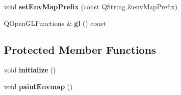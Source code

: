 \begin{DoxyCompactItemize}
\item 
\hypertarget{class_painter_afb568401ef2792e27e4f565bf35cb6bb}{}void {\bfseries set\+Env\+Map\+Prefix} (const Q\+String \&env\+Map\+Prefix)\label{class_painter_afb568401ef2792e27e4f565bf35cb6bb}

\item 
\hypertarget{class_painter_a0c2b82efd3882c162d9807282aab189f}{}Q\+Open\+G\+L\+Functions \& {\bfseries gl} () const \label{class_painter_a0c2b82efd3882c162d9807282aab189f}

\end{DoxyCompactItemize}
\subsection*{Protected Member Functions}
\begin{DoxyCompactItemize}
\item 
\hypertarget{class_painter_a12f9623c2acf87eced6e141e7638804e}{}void {\bfseries initialize} ()\label{class_painter_a12f9623c2acf87eced6e141e7638804e}

\item 
\hypertarget{class_painter_a3deca470f67f8e9fafc0cc901c689c02}{}void {\bfseries paint\+Envmap} ()\label{class_painter_a3deca470f67f8e9fafc0cc901c689c02}

\end{DoxyCompactItemize}
